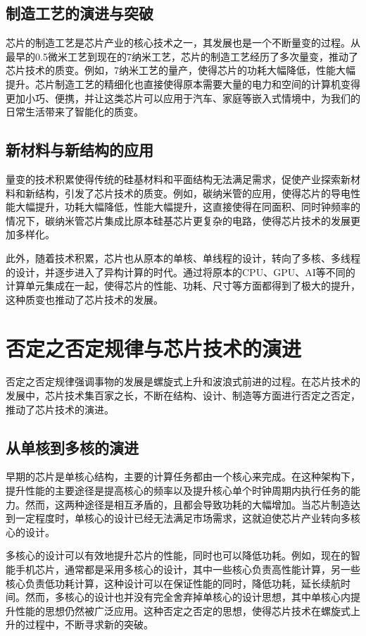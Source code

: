 \documentclass[12pt,hyperref,a4paper,UTF8]{ctexart}
\begin{document}
\subsection{制造工艺的演进与突破}

芯片的制造工艺是芯片产业的核心技术之一，其发展也是一个不断量变的过程。从最早的0.5微米工艺到现在的7纳米工艺，芯片的制造工艺经历了多次量变，推动了芯片技术的质变。例如，7纳米工艺的量产，使得芯片的功耗大幅降低，性能大幅提升。芯片制造工艺的精细化也直接使得原本需要大量的电力和空间的计算机变得更加小巧、便携，并让这类芯片可以应用于汽车、家庭等嵌入式情境中，为我们的日常生活带来了智能化的质变。

\subsection{新材料与新结构的应用}

量变的技术积累使得传统的硅基材料和平面结构无法满足需求，促使产业探索新材料和新结构，引发了芯片技术的质变。例如，碳纳米管的应用，使得芯片的导电性能大幅提升，功耗大幅降低，性能大幅提升，这直接使得在同面积、同时钟频率的情况下，碳纳米管芯片集成比原本硅基芯片更复杂的电路，使得芯片技术的发展更加多样化。

此外，随着技术积累，芯片也从原本的单核、单线程的设计，转向了多核、多线程的设计，并逐步进入了异构计算的时代。通过将原本的CPU、GPU、AI等不同的计算单元集成在一起，使得芯片的性能、功耗、尺寸等方面都得到了极大的提升，这种质变也推动了芯片技术的发展。

\section{否定之否定规律与芯片技术的演进}

否定之否定规律强调事物的发展是螺旋式上升和波浪式前进的过程。在芯片技术的发展中，芯片技术集百家之长，不断在结构、设计、制造等方面进行否定之否定，推动了芯片技术的演进。

\subsection{从单核到多核的演进}

早期的芯片是单核心结构，主要的计算任务都由一个核心来完成。在这种架构下，提升性能的主要途径是提高核心的频率以及提升核心单个时钟周期内执行任务的能力。然而，这两种途径是相互矛盾的，且都会导致功耗的大幅增加。当芯片制造达到一定程度时，单核心的设计已经无法满足市场需求，这就迫使芯片产业转向多核心的设计。

多核心的设计可以有效地提升芯片的性能，同时也可以降低功耗。例如，现在的智能手机芯片，通常都是采用多核心的设计，其中一些核心负责高性能计算，另一些核心负责低功耗计算，这种设计可以在保证性能的同时，降低功耗，延长续航时间。然而，多核心的设计也并没有完全舍弃掉单核心的设计思想，其中单核心内提升性能的思想仍然被广泛应用。这种否定之否定的思想，使得芯片技术在螺旋式上升的过程中，不断寻求新的突破。
\end{document}
